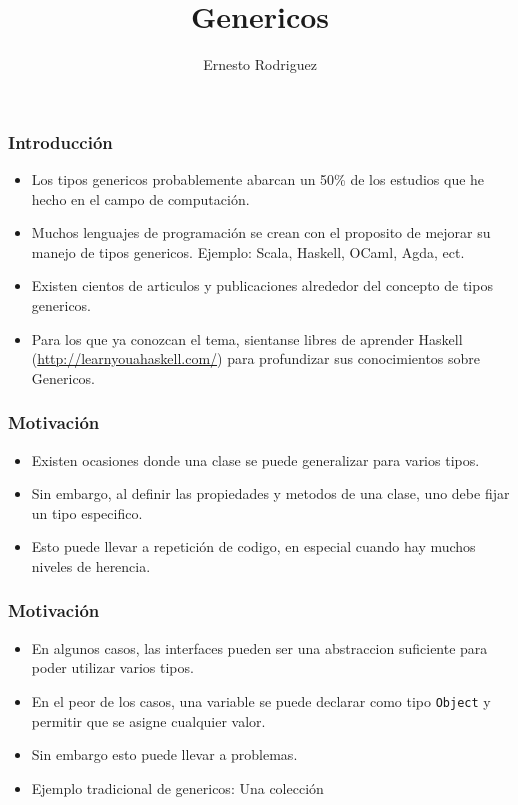 \documentclass{beamer}
\title{Genericos}
\author{Ernesto Rodriguez}
\institute{
    Universidad del Itsmo \\
    \medskip \textit{erodriguez@unis.edu.gt}
}
\date[\today]{}
\begin{document}
\begin{frame}
\titlepage
\end{frame}

\begin{frame}
    \frametitle{Introducci\'on}
    \begin{itemize}
        \item{Los tipos genericos probablemente abarcan un 50\% de los
        estudios que he hecho en el campo de computaci\'on.}
        \item{Muchos lenguajes de programaci\'on se crean con el
        proposito de mejorar su manejo de tipos genericos.
        Ejemplo: Scala, Haskell, OCaml, Agda, ect.}
        \item{Existen cientos de articulos y publicaciones alrededor
        del concepto de tipos genericos.}
        \item{Para los que ya conozcan el tema, sientanse libres de
        aprender Haskell (\url{http://learnyouahaskell.com/}) para profundizar
        sus conocimientos sobre Genericos.}
    \end{itemize}
\end{frame}

\begin{frame}
    \frametitle{Motivaci\'on}
    \begin{itemize}
        \item{Existen ocasiones donde una clase se puede generalizar
        para varios tipos.}
        \item{Sin embargo, al definir las propiedades y metodos de
        una clase, uno debe fijar un tipo especifico.}
        \item{Esto puede llevar a repetici\'on de codigo, en
        especial cuando hay muchos niveles de herencia.}
    \end{itemize}
\end{frame}

\begin{frame}
    \frametitle{Motivaci\'on}
    \begin{itemize}
        \item{En algunos casos, las interfaces pueden ser una
        abstraccion suficiente para poder utilizar varios tipos.}
        \item{En el peor de los casos, una variable se puede
        declarar como tipo \texttt{Object} y permitir que se
        asigne cualquier valor.}
        \item{Sin embargo esto puede llevar a problemas.}
        \item{Ejemplo tradicional de genericos: Una colecci\'on}
    \end{itemize}
\end{frame}
\end{document}
